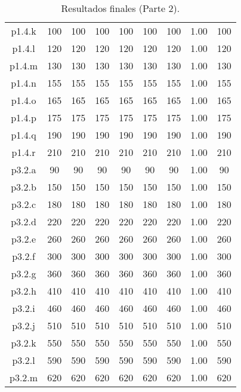 \begin{table}
\begin{center}
\begin{tabular}{ |c|c|c|c|c|c|c|c|c| }
p1.4.k & 100 & 100 & 100 & 100 & 100 & 100 & 1.00 & 100  \\
p1.4.l & 120 & 120 & 120 & 120 & 120 & 120 & 1.00 & 120  \\
p1.4.m & 130 & 130 & 130 & 130 & 130 & 130 & 1.00 & 130  \\
p1.4.n & 155 & 155 & 155 & 155 & 155 & 155 & 1.00 & 155  \\
p1.4.o & 165 & 165 & 165 & 165 & 165 & 165 & 1.00 & 165  \\
p1.4.p & 175 & 175 & 175 & 175 & 175 & 175 & 1.00 & 175  \\
p1.4.q & 190 & 190 & 190 & 190 & 190 & 190 & 1.00 & 190  \\
p1.4.r & 210 & 210 & 210 & 210 & 210 & 210 & 1.00 & 210  \\
p3.2.a & 90 & 90 & 90 & 90 & 90 & 90 & 1.00 & 90  \\
p3.2.b & 150 & 150 & 150 & 150 & 150 & 150 & 1.00 & 150  \\
p3.2.c & 180 & 180 & 180 & 180 & 180 & 180 & 1.00 & 180  \\
p3.2.d & 220 & 220 & 220 & 220 & 220 & 220 & 1.00 & 220  \\
p3.2.e & 260 & 260 & 260 & 260 & 260 & 260 & 1.00 & 260  \\
p3.2.f & 300 & 300 & 300 & 300 & 300 & 300 & 1.00 & 300  \\
p3.2.g & 360 & 360 & 360 & 360 & 360 & 360 & 1.00 & 360  \\
p3.2.h & 410 & 410 & 410 & 410 & 410 & 410 & 1.00 & 410  \\
p3.2.i & 460 & 460 & 460 & 460 & 460 & 460 & 1.00 & 460  \\
p3.2.j & 510 & 510 & 510 & 510 & 510 & 510 & 1.00 & 510  \\
p3.2.k & 550 & 550 & 550 & 550 & 550 & 550 & 1.00 & 550  \\
p3.2.l & 590 & 590 & 590 & 590 & 590 & 590 & 1.00 & 590  \\
p3.2.m & 620 & 620 & 620 & 620 & 620 & 620 & 1.00 & 620  \\
\hline
\end{tabular}
\end{center}
\caption{Resultados finales (Parte 2).}
\label{tab:resultadosFinales2}
\end{table}




